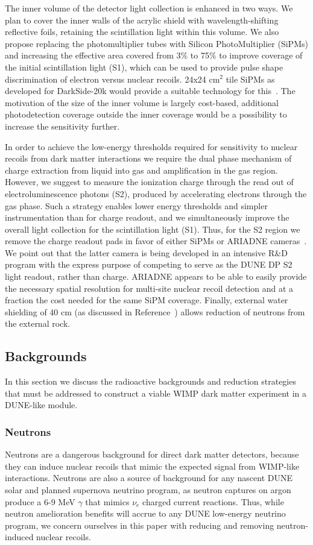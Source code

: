 \documentclass[a4paper,11pt]{article}
\begin{document}
The inner volume of the detector light collection is enhanced in two ways. We plan to cover the inner walls of the acrylic shield with wavelength-shifting reflective foils, retaining the scintillation light within this volume. We also propose replacing the photomultiplier tubes with Silicon PhotoMultiplier (SiPMs) and increasing the effective area covered from 3\% to 75\% to improve coverage of the initial scintillation light (S1), which can be used to provide pulse shape discrimination of electron versus nuclear recoils. 24x24 cm$^2$ tile SiPMs as developed for DarkSide-20k would provide a suitable technology for this~\cite{darkside_sipm}. The motivation of the size of the inner volume is largely cost-based, additional photodetection coverage outside the inner coverage would be a possibility to increase the sensitivity further.

In order to achieve the low-energy thresholds required for sensitivity to nuclear recoils from dark matter interactions we require the dual phase mechanism of charge extraction from liquid into gas and amplification in the gas region.  However, we suggest to measure the ionization charge through the read out of electroluminescence photons (S2), produced by accelerating electrons through the gas phase. Such a strategy enables lower energy thresholds and simpler instrumentation than for charge readout, and we simultaneously improve the overall light collection for the scintillation light (S1). Thus, for the S2 region we remove the charge readout pads in favor of either SiPMs or ARIADNE cameras~\cite{ARIADNE}. We point out that the latter camera is being developed in an intensive R\&D program with the express purpose of competing to serve as the DUNE DP S2 light readout, rather than charge. ARIADNE appears to be able to easily provide the necessary spatial resolution for  multi-site nuclear recoil detection and at a fraction the cost needed for the same SiPM coverage. Finally, external water shielding of 40 cm (as discussed in Reference~\cite{beacom_bkd}) allows reduction of neutrons from the external rock.

\subsection{Backgrounds}
In this section we discuss the radioactive backgrounds and reduction strategies that must be addressed to construct a viable WIMP dark matter experiment in a DUNE-like module.

\subsubsection{Neutrons}
Neutrons are a dangerous background for direct dark matter detectors, because they can induce nuclear recoils that mimic the expected signal from WIMP-like interactions. Neutrons are also a source of background for any nascent DUNE solar and planned supernova neutrino program, as neutron captures on argon produce a 6-9 MeV $\gamma$ that mimics $\nu_e$ charged current reactions. Thus, while neutron amelioration benefits will accrue to any DUNE low-energy neutrino program, we concern ourselves in this paper with reducing and removing neutron-induced nuclear recoils. 
\end{document}
